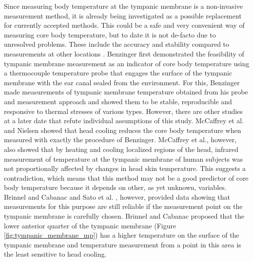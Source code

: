 Since measuring body temperature at the tympanic membrane is a non-invasive measurement method, it is already being investigated as a possible replacement for currently accepted methods.
This could be a safe and very convenient way of measuring core body temperature, but to date it is not de-facto due to unresolved problems.
These include the accuracy and stability compared to measurements at other locations \cite{maxtonEstimatingCoreTemperature2004, fulbrookCoreBodyTemperature1997, mumaComparisonRectalAxillary1991, rothAgreementRectalTympanic1996}.
Benzinger \cite{benzingerHeatRegulationHomeostasis1969, benzingerClinicalTemperatureNew1969, benzingerPhysicalHeatRegulation1959} first demonstrated the feasibility of tympanic membrane measurement as an indicator of core body temperature using a thermocouple temperature probe that engages the surface of the tympanic membrane with the ear canal sealed from the environment.
For this, Benzinger made measurements of tympanic membrane temperature obtained from his probe and measurement approach and showed them to be stable, reproducible and responsive to thermal stresses of various types.
However, there are other studies at a later date that refute individual assumptions of this study.
McCaffrey et al. \cite{mccaffreyEffectHeadSkin1975} and Nielsen \cite{nielsenNaturalCoolingBrain1988} showed that head cooling reduces the core body temperature when measured with exactly the procedure of Benzinger.
McCaffrey et al., however, also showed that by heating and cooling localized regions of the head, infrared measurement of temperature at the tympanic membrane of human subjects was not proportionally affected by changes in head skin temperature.
This suggests a contradiction, which means that this method may not be a good predictor of core body temperature because it depends on other, as yet unknown, variables.
Brinnel and Cabanac \cite{brinnelTympanicTemperatureCore1989} and Sato et al. \cite{satoReexaminationTympanicMembrane1996}, however, provided data showing that measurements for this purpose are still reliable if the measurement point on the tympanic membrane is carefully chosen. 
Brinnel and Cabanac proposed that the lower anterior quarter of the tympanic membrane (Figure \ref{fig:tympanic_membrane_mp}) has a higher temperature on the surface of the tympanic membrane and temperature measurement from a point in this area is the least sensitive to head cooling.
